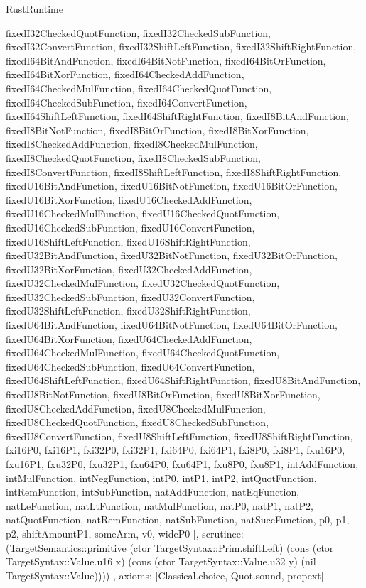 \begin{lexlean}{RustRuntime}
\begin{semanticmodule}
{{      fixedI32CheckedQuotFunction,
      fixedI32CheckedSubFunction,
      fixedI32ConvertFunction,
      fixedI32ShiftLeftFunction,
      fixedI32ShiftRightFunction,
      fixedI64BitAndFunction,
      fixedI64BitNotFunction,
      fixedI64BitOrFunction,
      fixedI64BitXorFunction,
      fixedI64CheckedAddFunction,
      fixedI64CheckedMulFunction,
      fixedI64CheckedQuotFunction,
      fixedI64CheckedSubFunction,
      fixedI64ConvertFunction,
      fixedI64ShiftLeftFunction,
      fixedI64ShiftRightFunction,
      fixedI8BitAndFunction,
      fixedI8BitNotFunction,
      fixedI8BitOrFunction,
      fixedI8BitXorFunction,
      fixedI8CheckedAddFunction,
      fixedI8CheckedMulFunction,
      fixedI8CheckedQuotFunction,
      fixedI8CheckedSubFunction,
      fixedI8ConvertFunction,
      fixedI8ShiftLeftFunction,
      fixedI8ShiftRightFunction,
      fixedU16BitAndFunction,
      fixedU16BitNotFunction,
      fixedU16BitOrFunction,
      fixedU16BitXorFunction,
      fixedU16CheckedAddFunction,
      fixedU16CheckedMulFunction,
      fixedU16CheckedQuotFunction,
      fixedU16CheckedSubFunction,
      fixedU16ConvertFunction,
      fixedU16ShiftLeftFunction,
      fixedU16ShiftRightFunction,
      fixedU32BitAndFunction,
      fixedU32BitNotFunction,
      fixedU32BitOrFunction,
      fixedU32BitXorFunction,
      fixedU32CheckedAddFunction,
      fixedU32CheckedMulFunction,
      fixedU32CheckedQuotFunction,
      fixedU32CheckedSubFunction,
      fixedU32ConvertFunction,
      fixedU32ShiftLeftFunction,
      fixedU32ShiftRightFunction,
      fixedU64BitAndFunction,
      fixedU64BitNotFunction,
      fixedU64BitOrFunction,
      fixedU64BitXorFunction,
      fixedU64CheckedAddFunction,
      fixedU64CheckedMulFunction,
      fixedU64CheckedQuotFunction,
      fixedU64CheckedSubFunction,
      fixedU64ConvertFunction,
      fixedU64ShiftLeftFunction,
      fixedU64ShiftRightFunction,
      fixedU8BitAndFunction,
      fixedU8BitNotFunction,
      fixedU8BitOrFunction,
      fixedU8BitXorFunction,
      fixedU8CheckedAddFunction,
      fixedU8CheckedMulFunction,
      fixedU8CheckedQuotFunction,
      fixedU8CheckedSubFunction,
      fixedU8ConvertFunction,
      fixedU8ShiftLeftFunction,
      fixedU8ShiftRightFunction,
      fxi16P0,
      fxi16P1,
      fxi32P0,
      fxi32P1,
      fxi64P0,
      fxi64P1,
      fxi8P0,
      fxi8P1,
      fxu16P0,
      fxu16P1,
      fxu32P0,
      fxu32P1,
      fxu64P0,
      fxu64P1,
      fxu8P0,
      fxu8P1,
      intAddFunction,
      intMulFunction,
      intNegFunction,
      intP0,
      intP1,
      intP2,
      intQuotFunction,
      intRemFunction,
      intSubFunction,
      natAddFunction,
      natEqFunction,
      natLeFunction,
      natLtFunction,
      natMulFunction,
      natP0,
      natP1,
      natP2,
      natQuotFunction,
      natRemFunction,
      natSubFunction,
      natSuccFunction,
      p0,
      p1,
      p2,
      shiftAmountP1,
      someArm,
      v0,
      wideP0
    ],
    scrutinee: (TargetSemantics::primitive (ctor TargetSyntax::Prim.shiftLeft) (cons (ctor TargetSyntax::Value.u16 x) (cons (ctor TargetSyntax::Value.u32 y) (nil TargetSyntax::Value))))
  },
  axioms: [Classical.choice, Quot.sound, propext]
}


\end{semanticmodule}
\end{lexlean}
